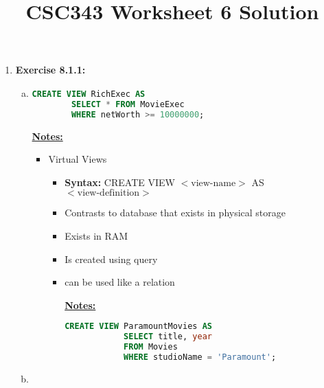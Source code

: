 \documentclass[12pt]{article}
\begin{document}
\title{CSC343 Worksheet 6 Solution}
\maketitle

\begin{enumerate}[1.]
    \item \textbf{Exercise 8.1.1:}

    \bigskip

    \begin{enumerate}[a)]
        \item

    \begin{lstlisting}[language=SQL]
    CREATE VIEW RichExec AS
        SELECT * FROM MovieExec
        WHERE netWorth >= 10000000;
    \end{lstlisting}

        \bigskip

        \underline{\textbf{Notes:}}

        \bigskip

        \begin{itemize}
            \item Virtual Views
            \begin{itemize}
                \item \textbf{Syntax:} CREATE VIEW $<\text{view-name}>$ AS $<\text{view-definition}>$
                \item Contrasts to database that exists in physical storage
                \item Exists in RAM
                \item Is created using query
                \item can be used like a relation

                \bigskip

                \underline{\textbf{Notes:}}

                \bigskip

        \begin{lstlisting}[language=SQL]
        CREATE VIEW ParamountMovies AS
            SELECT title, year
            FROM Movies
            WHERE studioName = 'Paramount';
        \end{lstlisting}
            \end{itemize}
        \end{itemize}

        \item


\end{enumerate}
\end{enumerate}
\end{document}
